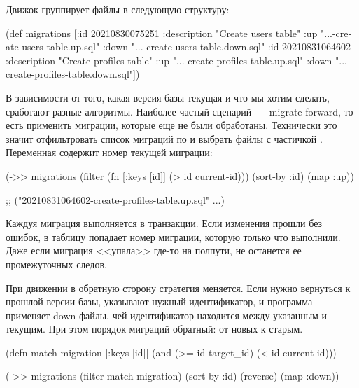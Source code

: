 Движок группирует файлы в следующую структуру:

\begin{english}
  \begin{clojure}
(def migrations
  [{:id 20210830075251
    :description "Create users table"
    :up "...-create-users-table.up.sql"
    :down "...-create-users-table.down.sql"}
   {:id 20210831064602
    :description "Create profiles table"
    :up "...-create-profiles-table.up.sql"
    :down "...-create-profiles-table.down.sql"}])
  \end{clojure}
\end{english}

В зависимости от того, какая версия базы текущая и что мы хотим сделать, сработают разные алгоритмы. Наиболее частый сценарий~--- migrate forward, то есть применить миграции, которые еще не были обработаны. Технически это значит отфильтровать список миграций по  и выбрать файлы с частичкой . Переменная   содержит номер текущей миграции:

\begin{english}
  \begin{clojure/lines}
(->> migrations
     (filter (fn [{:keys [id]}]
               (> id current-id)))
     (sort-by :id)
     (map :up))

;; ("20210831064602-create-profiles-table.up.sql" ...)
  \end{clojure/lines}
\end{english}

Каждуя миграция выполняется в транзакции. Если изменения прошли без ошибок, в таблицу  попадает номер миграции, которую только что выполнили. Даже если миграция <<упала>> где-то на полпути, не останется ее промежуточных следов.

При движении в обратную сторону стратегия меняется. Если нужно вернуться к прошлой версии базы, указывают нужный идентификатор, и программа применяет down-файлы, чей идентификатор находится между указанным и текущим. При этом порядок миграций обратный: от новых к старым.

\begin{english}
  \begin{clojure}
(defn match-migration
  [{:keys [id]}]
  (and (>= id target_id)
       (< id current-id)))

(->> migrations
     (filter match-migration)
     (sort-by :id)
     (reverse)
     (map :down))
  \end{clojure}
\end{english}

